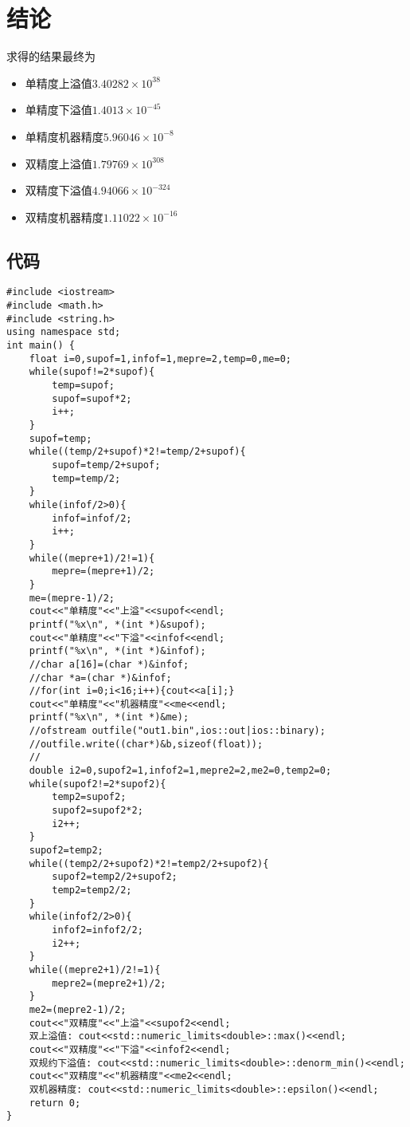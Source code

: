 \documentclass[a4paper,11pt,onecolumn,twoside]{article}
\begin{document}
\section{结论}
求得的结果最终为
\begin{itemize}
\item 单精度上溢值$3.40282\times10^{38}$
\item 单精度下溢值$1.4013\times10^{-45}$
\item 单精度机器精度$5 . 9 6 0 4 6\times10^{-8}$
\item 双精度上溢值$1.79769\times10^{308}$
\item 双精度下溢值$4.94066\times10^{-324}$
\item 双精度机器精度$1 . 1 1 0 2 2\times10^{-16}$
\end{itemize}
					

\begin{appendices}
      \section{代码}
      \begin{lstlisting}
#include <iostream>
#include <math.h>
#include <string.h>
using namespace std;
int main() {
    float i=0,supof=1,infof=1,mepre=2,temp=0,me=0;
    while(supof!=2*supof){
        temp=supof;
        supof=supof*2;
        i++;
    }
    supof=temp;
    while((temp/2+supof)*2!=temp/2+supof){
        supof=temp/2+supof;
        temp=temp/2;
    }
    while(infof/2>0){
        infof=infof/2;
        i++;
    }
    while((mepre+1)/2!=1){
        mepre=(mepre+1)/2;
    }
    me=(mepre-1)/2;
    cout<<"单精度"<<"上溢"<<supof<<endl;
    printf("%x\n", *(int *)&supof);
    cout<<"单精度"<<"下溢"<<infof<<endl;
    printf("%x\n", *(int *)&infof);
    //char a[16]=(char *)&infof;
    //char *a=(char *)&infof;
    //for(int i=0;i<16;i++){cout<<a[i];}
    cout<<"单精度"<<"机器精度"<<me<<endl;
    printf("%x\n", *(int *)&me);
    //ofstream outfile("out1.bin",ios::out|ios::binary);
    //outfile.write((char*)&b,sizeof(float));
    //
    double i2=0,supof2=1,infof2=1,mepre2=2,me2=0,temp2=0;
    while(supof2!=2*supof2){
        temp2=supof2;
        supof2=supof2*2;
        i2++;
    }
    supof2=temp2;
    while((temp2/2+supof2)*2!=temp2/2+supof2){
        supof2=temp2/2+supof2;
        temp2=temp2/2;
    }
    while(infof2/2>0){
        infof2=infof2/2;
        i2++;
    }
    while((mepre2+1)/2!=1){
        mepre2=(mepre2+1)/2;
    }
    me2=(mepre2-1)/2;
    cout<<"双精度"<<"上溢"<<supof2<<endl;
    双上溢值: cout<<std::numeric_limits<double>::max()<<endl;
    cout<<"双精度"<<"下溢"<<infof2<<endl;
    双规约下溢值: cout<<std::numeric_limits<double>::denorm_min()<<endl;
    cout<<"双精度"<<"机器精度"<<me2<<endl;
    双机器精度: cout<<std::numeric_limits<double>::epsilon()<<endl;
    return 0;
}


      \end{lstlisting}
       \end{appendices}
\end{document}
